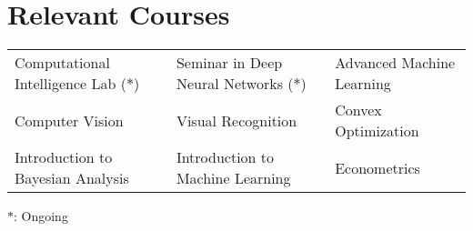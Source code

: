 \setlength\extrarowheight{3pt}  %

\section*{Relevant Courses}
\begin{tabulary}{\textwidth}{L L L}
    Computational Intelligence Lab ($\ast$)&
    Seminar in Deep Neural Networks ($\ast$)&
    Advanced Machine Learning\\
    Computer Vision&
    Visual Recognition&
    Convex Optimization\\
    Introduction to Bayesian Analysis&
    Introduction to Machine Learning&
    Econometrics
\end{tabulary}

\vspace{2mm}
{\small $\ast$: Ongoing}
